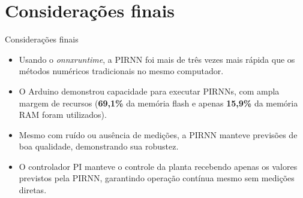 \section{Considerações finais}

\begin{frame}{Considerações finais}
  \begin{itemize}
    \item Usando o \textit{onnxruntime}, a PIRNN foi mais de três vezes mais rápida que os métodos numéricos tradicionais no mesmo computador.
    \item O Arduino demonstrou capacidade para executar PIRNNs, com ampla margem de recursos (\textbf{69,1\%} da memória flash e apenas \textbf{15,9\%} da memória RAM foram utilizados).
    \item Mesmo com ruído ou ausência de medições, a PIRNN manteve previsões de boa qualidade, demonstrando sua robustez.
    \item O controlador PI manteve o controle da planta recebendo apenas os valores previstos pela PIRNN, garantindo operação contínua mesmo sem medições diretas.
  \end{itemize}
\end{frame}
